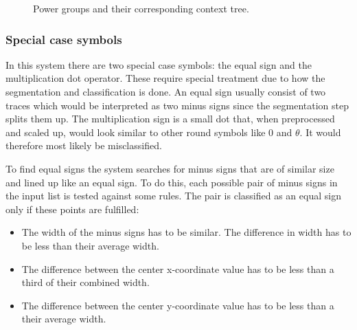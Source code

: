 \begin{figure}[H]
    \caption{Power groups and their corresponding context tree.}
\end{figure}


\subsubsection{Special case symbols}
\label{interpretation-special-symbols}

In this system there are two special case symbols: the equal sign and the multiplication dot operator. These require special treatment due to how the segmentation and classification is done. An equal sign usually consist of two traces which would be interpreted as two minus signs since the segmentation step splits them up. The multiplication sign is a small dot that, when preprocessed and scaled up, would look similar to other round symbols like 0 and $\theta$. It would therefore most likely be misclassified.

To find equal signs the system searches for minus signs that are of similar size and lined up like an equal sign. To do this, each possible pair of minus signs in the input list is tested against some rules. The pair is classified as an equal sign only if these points are fulfilled:

\begin{itemize}
    \setlength\itemsep{0em}
    \item The width of the minus signs has to be similar. The difference in width has to be less than their average width.
    \item The difference between the center x-coordinate value has to be less than a third of their combined width.
    \item The difference between the center y-coordinate value has to be less than a their average width.
\end{itemize}

